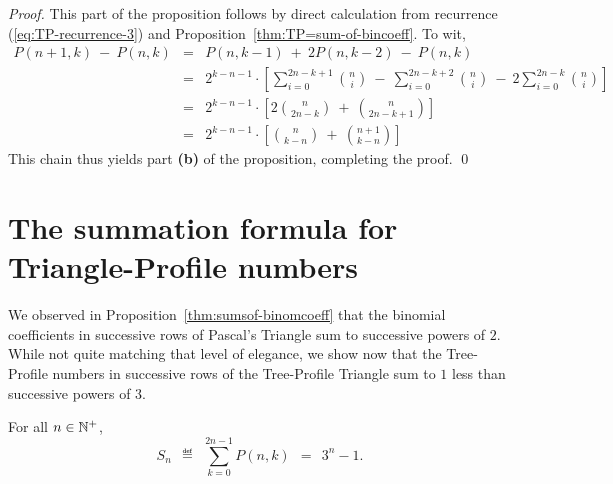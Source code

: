\begin{proof}
This part of the proposition follows by direct calculation from
recurrence (\ref{eq:TP-recurrence-3}) and
Proposition~\ref{thm:TP=sum-of-bincoeff}.  To wit,
\begin{eqnarray*}
P(n+1, k) \ - \ P(n, k)
  & = &
P(n, k-1) \ + \ 2 P(n, k-2) \ - \ P(n,k) \\
  & = &
2^{k-n-1} \cdot \left[
\sum_{i=0}^{2n-k+1} {n \choose i}
 \ - \ \sum_{i=0}^{2n-k+2} {n \choose i}
 \ - \ 2 \sum_{i=0}^{2n-k} {n \choose i}
\right] \\
  & = & 
2^{k-n-1} \cdot \left[
  2 {n \choose {2n-k}} \ + \ {n \choose {2n-k+1}} \right] \\
  & = &
2^{k-n-1} \cdot \left[
   {n \choose {k-n}} \ + \ {{n+1} \choose {k-n}} \right]
\end{eqnarray*}
This chain thus yields part {\bf (b)} of the proposition, completing
the proof.
\qed
\end{proof}

\section{The summation formula for Triangle-Profile numbers}

We observed in Proposition~\ref{thm:sumsof-binomcoeff} that the
binomial coefficients in successive rows of Pascal's Triangle sum to
successive powers of $2$.  While not quite matching that level of
elegance, we show now that the Tree-Profile numbers in successive rows
of the Tree-Profile Triangle sum to $1$ less than successive powers of
$3$.

\begin{prop}
\label{thm:TP-summation}
For all $n \in \mathbb{N}^+$,
\begin{equation}
\label{eq:TP-summation}
S_n \ \ \eqdef \ \ \sum_{k=0}^{2n-1} P(n,k) \ \ = \ \ 3^n -1.
\end{equation}
\end{prop}
 
